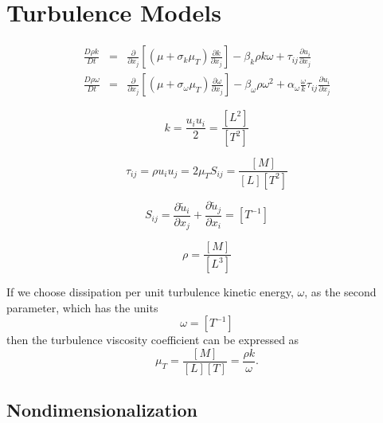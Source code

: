 \section{Turbulence Models}

\begin{eqnarray}
\frac{D \rho k}{Dt}
&=&
\frac{\partial}{\partial x_j}
\left[
\left(
\mu + \sigma_k \mu_T
\right)
\frac{\partial k}{\partial x_j}
\right]
-
\beta_k \rho k \omega
+
\tau_{ij}\frac{\partial u_i}{\partial x_j}
\label{Eq:KTransport}
\\
\frac{D \rho \omega}{Dt}
&=&
\frac{\partial}{\partial x_j}
\left[
\left(
\mu + \sigma_\omega \mu_T
\right)
\frac{\partial \omega}{\partial x_j}
\right]
-
\beta_\omega \rho \omega^2
+
\alpha_\omega
\frac{\omega}{k}
\tau_{ij}\frac{\partial u_i}{\partial x_j}
\label{Eq:OmegaTransport}
\end{eqnarray}

\[
k = \frac{u_i u_i}{2} = \frac{[L^2]}{[T^2]}
\]

\[
\tau_{ij} = \rho u_i u_j = 2 \mu_T S_{ij} = \frac{[M]}{[L][T^2]}
\]

\[
S_{ij} = \frac{\partial \tilde{u}_i}{\partial x_j} + \frac{\partial \tilde{u}_j}{\partial x_i} = [T^{-1}]
\]

\[
\rho = \frac{[M]}{[L^3]}
\]

If we choose dissipation per unit turbulence kinetic energy, $\omega$, as the second parameter, which has the units
\[
\omega = [T^{-1}]
\]
then the turbulence viscosity coefficient can be expressed as
\[
\mu_T = \frac{[M]}{[L][T]}
= \frac{\rho k}{\omega}
.
\]

\subsection{Nondimensionalization}


